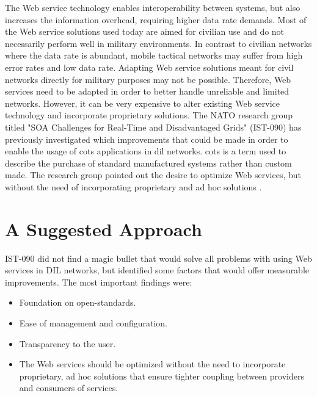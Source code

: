The Web service technology enables interoperability between systems, but also
increases the information overhead, requiring higher data rate demands. Most of
the Web service solutions used today are aimed for civilian use and do not
necessarily perform well in military environments. In contrast to civilian
networks where the data rate is abundant, mobile tactical networks may suffer
from high error rates and low data rate. Adapting Web service solutions meant
for civil networks directly for military purposes may not be possible.
Therefore, Web services need to be adapted in order to better handle unreliable
and limited networks. However, it can be very expensive to alter existing Web
service technology and incorporate proprietary solutions. The NATO research
group titled "SOA Challenges for Real-Time and Disadvantaged Grids" (IST-090)
has previously investigated which improvements that could be made in order to
enable the usage of \gls{cots} applications in \gls{dil} networks. \Gls{cots} is
a term used to describe the purchase of standard manufactured systems rather
than custom made. The research group pointed out the desire to optimize Web
services, but without the need of incorporating proprietary and ad hoc solutions
\cite{ist-090}.


\section{A Suggested Approach}
\label{section:hypothesis}

IST-090 did not find a magic bullet that would solve all problems with using Web
services in DIL networks, but identified some factors that would offer measurable
improvements. The most important findings were:

\begin{itemize}

    \item Foundation on open-standards.

    \item Ease of management and configuration.

    \item Transparency to the user.

    \item The Web services should be optimized without the need to incorporate
    proprietary, ad hoc solutions that ensure tighter coupling between providers
    and consumers of services.

\end{itemize}

